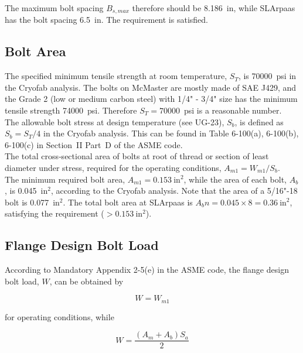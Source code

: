 The maximum bolt spacing $B_{s,max}$ therefore should be 8.186~in,
while SLArpaas has the bolt spacing 6.5~in.
The requirement is satisfied.

\subsection{Bolt Area}
\label{app:bolt_area}

The specified minimum tensile strength at room temperature, $S_T$,
is 70000~psi in the Cryofab analysis.
The bolts on McMaster are mostly made of SAE J429, and the Grade 2
(low or medium carbon steel) with 1/4" - 3/4" size has the minimum 
tensile strength 74000~psi.
Therefore $S_T = 70000$~psi is a reasonable number.\\

The allowable bolt stress at design temperature (see UG-23), $S_b$,
is defined as $S_b = S_T/4$ in the Cryofab analysis.
This can be found in Table 6-100(a), 6-100(b), 6-100(c) in Section~II 
Part~D of the ASME code.\\

The total cross‐sectional area of bolts at root of thread or section 
of least diameter under stress,
required for the operating conditions, $A_{m1} = W_{m1}/S_b$.\\

The minimum required bolt area, $A_{m1} = 0.153~\text{in}^2$,
while the area of each bolt, $A_b$, is 0.045~in$^2$, according to
the Cryofab analysis.
Note that the area of a 5/16"-18 bolt is 0.077~in$^2$.
The total bolt area at SLArpaas is $A_bn = 0.045\times 8 = 0.36~\text{in}^2$,
satisfying the requirement ($>0.153~\text{in}^2$).

\subsection{Flange Design Bolt Load}
\label{app:flange_bolt_load}

According to Mandatory Appendix 2-5(e) in the ASME code,
the flange design bolt load, $W$, can be obtained by

\begin{equation}
    W = W_{m1}
\end{equation}

for operating conditions, while

\begin{equation}
    W = \frac{(A_m+A_b)S_a}{2}
\label{eq:flange_bolt_load_gasket_seating}
\end{equation}

